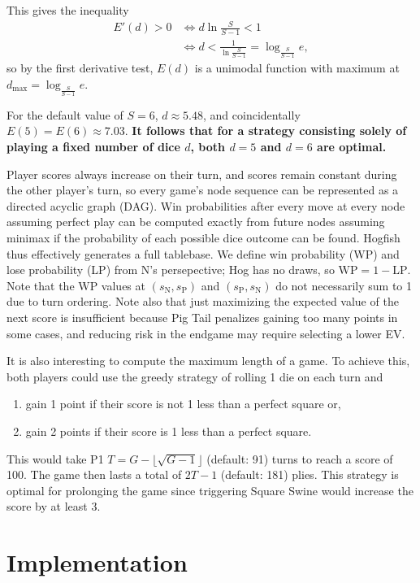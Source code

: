 \documentclass[12 pt]{article}
\newcommand{\smn}{s_\mathrm{N}}
\newcommand{\smp}{s_\mathrm{P}}
\begin{document}
			This gives the inequality
			\begin{align*}
				E'(d) > 0 &\iff d\ln\frac{S}{S - 1} < 1 \\
				&\iff d < \frac{1}{\ln\frac{S}{S - 1}} = \log_{\frac{S}{S - 1}} e,
			\end{align*}
			so by the first derivative test, $E(d)$ is a unimodal function with maximum at $d_\text{max} = \log_{\frac{S}{S - 1}} e$.
			
			For the default value of $S = 6$, $d \approx 5.48$, and coincidentally $E(5) = E(6) \approx 7.03$. \textbf{It follows that for a strategy consisting solely of playing a fixed number of dice $d$, both $d = 5$ and $d = 6$ are optimal.}

			Player scores always increase on their turn, and scores remain constant during the other player's turn, so every game's node sequence can be represented as a directed acyclic graph (DAG). Win probabilities after every move at every node assuming perfect play can be computed exactly from future nodes assuming minimax if the probability of each possible dice outcome can be found. Hogfish thus effectively generates a full tablebase. We define win probability (WP) and lose probability (LP) from N's persepective; Hog has no draws, so $\text{WP} = 1 - \text{LP}$. Note that the WP values at $(\smn, \smp)$ and $(\smp, \smn)$ do not necessarily sum to 1 due to turn ordering. Note also that just maximizing the expected value of the next score is insufficient because Pig Tail penalizes gaining too many points in some cases, and reducing risk in the endgame may require selecting a lower EV.

			It is also interesting to compute the maximum length of a game. To achieve this, both players could use the greedy strategy of rolling 1 die on each turn and
			\begin{enumerate}
				\item gain 1 point if their score is not 1 less than a perfect square or,
				\item gain 2 points if their score is 1 less than a perfect square.
			\end{enumerate}
			This would take P1 $T = G - \lfloor \sqrt{G - 1} \rfloor$ (default: 91) turns to reach a score of 100. The game then lasts a total of $2T - 1$ (default: 181) plies. This strategy is optimal for prolonging the game since triggering Square Swine would increase the score by at least $3$.

	\section{Implementation}
\end{document}
